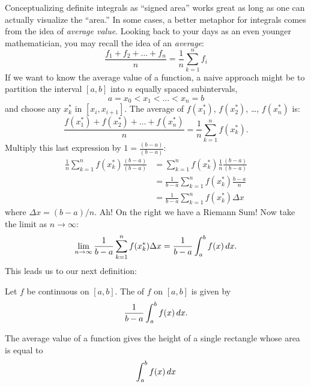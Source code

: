 \documentclass{ximera}
\begin{document}
Conceptualizing definite integrals as ``signed area'' works great as
long as one can actually visualize the ``area.'' In some cases, a
better metaphor for integrals comes from the idea of \textit{average
  value}.  Looking back to your days as an even younger mathematician,
you may recall the idea of an \textit{average}:
\[
\frac{f_1+f_2+\dots+f_n}{n} = \frac{1}{n}\sum_{k=1}^n f_i
\]
If we want to know the average value of a function, a naive approach
might be to partition the interval $[a,b]$ into $n$ equally spaced
subintervals, 
\[
a=x_0 < x_1 < \dots < x_{n}=b
\]
and choose any $x_k^*$ in $[x_i,x_{i+1}]$. The average of $f(x_1^*)$,
$f(x_2^*)$, \dots, $f(x_n^*)$ is:
\[
\frac{f(x_1^*) + f(x_2^*) + \dots + f(x_n^*)}{n} = \frac1n\sum_{k=1}^n f(x_k^*).
\]
Multiply this last expression by $1 = \frac{(b-a)}{(b-a)}$:
\begin{align*}
  \frac1n \sum_{k=1}^n f(x_k^*)\frac{(b-a)}{(b-a)} &= \sum_{k=1}^n f(x_k^*)\frac1n \frac{(b-a)}{(b-a)} \\
  &= \frac{1}{b-a} \sum_{k=1}^n f(x_k^*)\frac{b-a}n  \\
  &=\frac{1}{b-a} \sum_{k=1}^n f(x_k^*)\Delta x
\end{align*}
where $\Delta x = (b-a)/n$.  Ah! On the right we have a Riemann Sum!
Now take the limit as $n\to\infty$:
\[
\lim_{n\to\infty} \frac{1}{b-a} \sum_{k=1}^n f(x_k^*)\Delta x = \frac{1}{b-a} \int_a^b f(x)\mathop{}\!d x.
\]
This leads us to our next definition:

\begin{definition}
  Let $f$ be continuous on $[a,b]$. The  of $f$ on
  $[a,b]$ is given by
  \[
  \frac{1}{b-a}\int_a^b f(x)\mathop{}\!d x.
  \]
\end{definition}

The average value of a function gives the height of a single rectangle whose area is equal to
\[
\int_a^b f(x) \mathop{}\!d x
\]
\begin{image}
\end{image}
\end{document}
